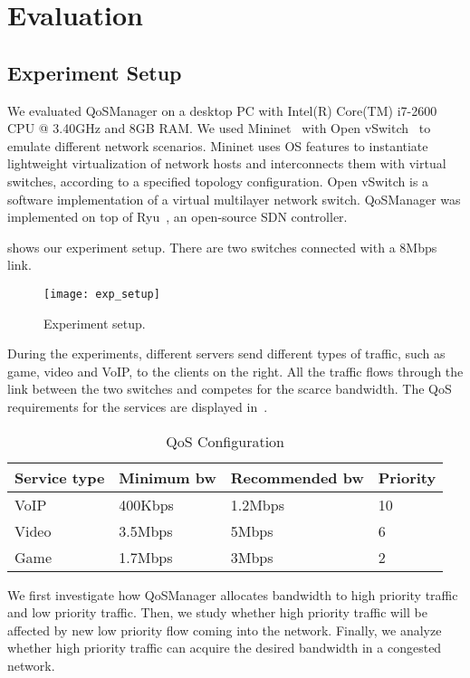 \section{Evaluation}
\label{sect:experiment} 

\subsection{Experiment Setup}
We evaluated QoSManager on a desktop PC with Intel(R) Core(TM) i7-2600 CPU @ 3.40GHz and 8GB RAM. We used Mininet~\cite{mininet} with Open vSwitch~\cite{openvswitch} to emulate
different network scenarios. Mininet uses OS features to instantiate lightweight virtualization of network hosts and interconnects them with virtual switches, according to a
specified topology configuration. Open vSwitch is a software implementation of a virtual multilayer network switch. QoSManager was implemented on top of Ryu~\cite{ryu}, an
open-source SDN controller.

 shows our experiment setup. There are two switches connected with a 8Mbps link.

\begin{figure}[htb]
\centering
\texttt{[image: exp\_setup]}
\caption{Experiment setup.}
\label{fig:setup}
\end{figure}

During the experiments, different servers send different types of traffic, such as game, video and VoIP, to the clients on the right. All the traffic flows through the link between
the two switches and competes for the scarce bandwidth. The QoS requirements for the services are displayed in~.

\begin{table}[htb]
\scriptsize
\caption{QoS Configuration}
\begin{tabular}{|l|l|l|l|}
\hline Service type & Minimum bw & Recommended bw & Priority \\
\hline
\hline VoIP & 400Kbps & 1.2Mbps & 10 \\
\hline Video & 3.5Mbps & 5Mbps & 6  \\
\hline Game & 1.7Mbps & 3Mbps & 2  \\
\hline
\end{tabular}
\label{table:qos_config}
\end{table}

We first investigate how QoSManager allocates bandwidth to high priority traffic and low priority traffic. Then, we study whether high priority traffic will be affected by
new low priority flow coming into the network. Finally, we analyze whether high priority traffic can acquire the desired bandwidth in a congested network.

